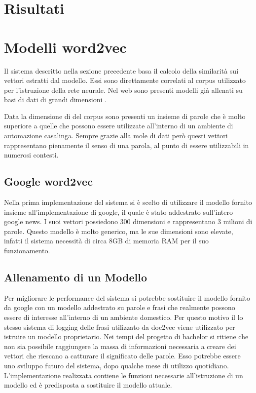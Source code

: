 \documentclass[twoside]{supsistudent}
\begin{document}
\chapter{Risultati}

\chapter{Modelli word2vec}
Il sistema descritto nella sezione precedente basa il calcolo della similarità sui vettori estratti dal modello. Essi sono direttamente correlati al corpus \cite{corpus} utilizzato per l'istruzione della rete neurale. Nel web sono presenti modelli già allenati su basi di dati di grandi dimensioni \cite{trained_models}.

Data la dimensione di del corpus sono presenti un insieme di parole che è molto superiore a quelle che possono essere utilizzate all'interno di un ambiente di automazione casalinga. Sempre grazie alla mole di dati però questi vettori rappresentano pienamente il senso di una parola, al punto di essere utilizzabili in numerosi contesti.
\section{Google word2vec}
Nella prima implementazione del sistema si è scelto di utilizzare il modello fornito insieme all'implementazione di google, il quale è stato addestrato sull'intero google news. I suoi vettori possiedono 300 dimensioni e rappresentano 3 milioni di parole. Questo modello è molto generico, ma le sue dimensioni sono elevate, infatti il sistema necessità di circa 8GB di memoria RAM per il suo funzionamento.
\section{Allenamento di un Modello}
Per migliorare le performance del sistema si potrebbe sostituire il modello fornito da google con un modello addestrato su parole e frasi che realmente possono essere di interesse all'interno di un ambiente domestico. Per questo motivo il lo stesso sistema di logging delle frasi utilizzato da doc2vec viene utilizzato per istruire un modello proprietario. Nei tempi del progetto di bachelor si ritiene che non sia possibile raggiungere la massa di informazioni necessaria a creare dei vettori che riescano a catturare il significato delle parole. Esso potrebbe essere uno sviluppo futuro del sistema, dopo qualche mese di utilizzo quotidiano. L'implementazione realizzata contiene le funzioni necessarie all'istruzione di un modello ed è predisposta a sostituire il modello attuale.
\end{document}
